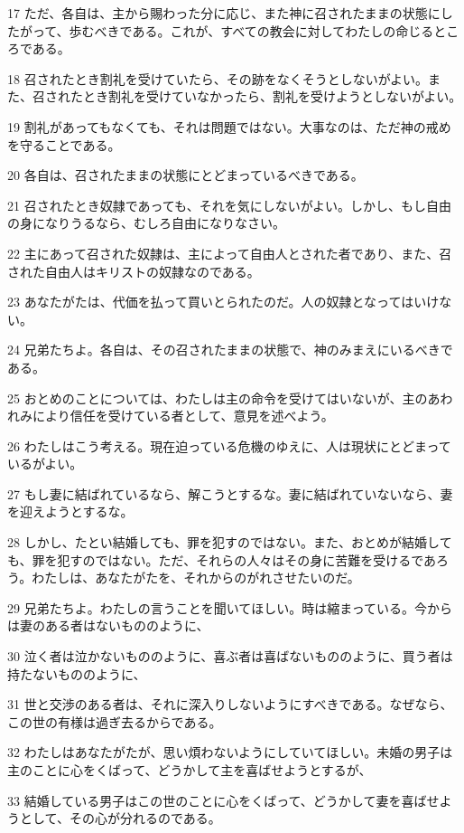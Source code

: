 \par 17 ただ、各自は、主から賜わった分に応じ、また神に召されたままの状態にしたがって、歩むべきである。これが、すべての教会に対してわたしの命じるところである。
\par 18 召されたとき割礼を受けていたら、その跡をなくそうとしないがよい。また、召されたとき割礼を受けていなかったら、割礼を受けようとしないがよい。
\par 19 割礼があってもなくても、それは問題ではない。大事なのは、ただ神の戒めを守ることである。
\par 20 各自は、召されたままの状態にとどまっているべきである。
\par 21 召されたとき奴隷であっても、それを気にしないがよい。しかし、もし自由の身になりうるなら、むしろ自由になりなさい。
\par 22 主にあって召された奴隷は、主によって自由人とされた者であり、また、召された自由人はキリストの奴隷なのである。
\par 23 あなたがたは、代価を払って買いとられたのだ。人の奴隷となってはいけない。
\par 24 兄弟たちよ。各自は、その召されたままの状態で、神のみまえにいるべきである。
\par 25 おとめのことについては、わたしは主の命令を受けてはいないが、主のあわれみにより信任を受けている者として、意見を述べよう。
\par 26 わたしはこう考える。現在迫っている危機のゆえに、人は現状にとどまっているがよい。
\par 27 もし妻に結ばれているなら、解こうとするな。妻に結ばれていないなら、妻を迎えようとするな。
\par 28 しかし、たとい結婚しても、罪を犯すのではない。また、おとめが結婚しても、罪を犯すのではない。ただ、それらの人々はその身に苦難を受けるであろう。わたしは、あなたがたを、それからのがれさせたいのだ。
\par 29 兄弟たちよ。わたしの言うことを聞いてほしい。時は縮まっている。今からは妻のある者はないもののように、
\par 30 泣く者は泣かないもののように、喜ぶ者は喜ばないもののように、買う者は持たないもののように、
\par 31 世と交渉のある者は、それに深入りしないようにすべきである。なぜなら、この世の有様は過ぎ去るからである。
\par 32 わたしはあなたがたが、思い煩わないようにしていてほしい。未婚の男子は主のことに心をくばって、どうかして主を喜ばせようとするが、
\par 33 結婚している男子はこの世のことに心をくばって、どうかして妻を喜ばせようとして、その心が分れるのである。
